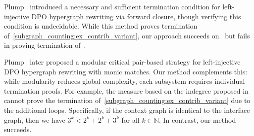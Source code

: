 Plump~\cite{plump1995ontermination} introduced a necessary and sufficient termination condition for left-injective DPO hypergraph rewriting via forward closure, though verifying this condition is undecidable. 
While this method proves termination of~\autoref{subgraph_counting:ex_contrib_variant}, our approach succeeds on~\cite[Example 3.8]{plump1995ontermination} but fails in proving termination of~\cite[Example 4.1]{plump1995ontermination}. 

Plump~\cite{plump2018modular} later proposed a modular critical pair-based strategy for left-injective DPO hypergraph rewriting with monic matches. 
Our method complements this: while modularity reduces global complexity, each subsystem requires individual termination proofs. For example, the measure based on the indegree proposed in~\cite{plump2018modular} cannot prove the termination of~\autoref{subgraph_counting:ex_contrib_variant} due to the additional loops. Specifically, if the context graph is identical to the interface graph, then we have $3^k < 2^k+2^k+3^k$ for all $k \in \mathbb{N}$. In contrast, our method succeeds.






